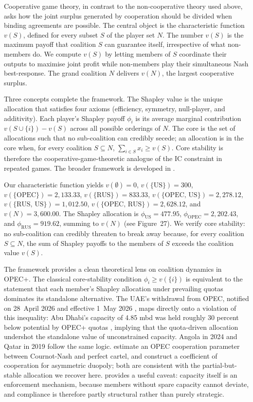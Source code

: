 Cooperative game theory, in contrast to the non-cooperative theory used
above, asks how the joint surplus generated by cooperation should be
divided when binding agreements are possible. The central object is the
characteristic function $v(S)$, defined for every subset $S$ of the
player set $N$. The number $v(S)$ is the maximum payoff that coalition
$S$ can guarantee itself, irrespective of what non-members do. We
compute $v(S)$ by letting members of $S$ coordinate their outputs to
maximise joint profit while non-members play their simultaneous Nash
best-response. The grand coalition $N$ delivers $v(N)$, the largest
cooperative surplus.

Three concepts complete the framework. The Shapley value
\citep{shapley1953} is the unique allocation that satisfies four axioms
(efficiency, symmetry, null-player, and additivity). Each player's
Shapley payoff $\phi_i$ is its average marginal contribution
$v(S \cup \{i\}) - v(S)$ across all possible orderings of $N$. The core
is the set of allocations such that no sub-coalition can credibly
secede; an allocation is in the core when, for every coalition
$S \subseteq N$, $\sum_{i \in S} x_i \ge v(S)$. Core stability is
therefore the cooperative-game-theoretic analogue of the IC constraint
in repeated games. The broader framework is developed in
\citet{shenoy1979}.

Our characteristic function yields $v(\emptyset) = 0$,
$v(\{\text{US}\}) = 300$, $v(\{\text{OPEC}\}) = 2{,}133.33$,
$v(\{\text{RUS}\}) = 833.33$,
$v(\{\text{OPEC, US}\}) = 2{,}278.12$,
$v(\{\text{RUS, US}\}) = 1{,}012.50$,
$v(\{\text{OPEC, RUS}\}) = 2{,}628.12$, and $v(N) = 3{,}600.00$. The
Shapley allocation is $\phi_{\text{US}} = 477.95$,
$\phi_{\text{OPEC}} = 2{,}202.43$, and $\phi_{\text{RUS}} = 919.62$,
summing to $v(N)$ (see Figure~27). We verify core stability: no
sub-coalition can credibly threaten to break away because, for every
coalition $S \subseteq N$, the sum of Shapley payoffs to the members of
$S$ exceeds the coalition value $v(S)$.

The framework provides a clean theoretical lens on coalition dynamics
in OPEC+. The classical core-stability condition
$\phi_i \ge v(\{i\})$ is equivalent to the statement that each member's
Shapley allocation under prevailing quotas dominates its standalone
alternative. The UAE's withdrawal from OPEC, notified on 28~April 2026 and effective
1~May 2026 \citep{emirates2026}, maps directly onto a violation of this
inequality: Abu Dhabi's capacity of 4.85 mbd was held roughly
30 percent below potential by OPEC+ quotas \citep{woodmac2026}, implying
that the quota-driven allocation undershot the standalone value of
unconstrained capacity. Angola in 2024 and Qatar in 2019 follow the
same logic. \citet{okulloreynes2016} estimate an OPEC cooperation
parameter between Cournot-Nash and perfect cartel, and
\citet{escrihuela2018} construct a coefficient of cooperation for
asymmetric duopoly; both are consistent with the partial-but-stable
allocation we recover here. \citet{ghoddusi2017} provides a useful
caveat: capacity itself is an enforcement mechanism, because members
without spare capacity cannot deviate, and compliance is therefore
partly structural rather than purely strategic.

